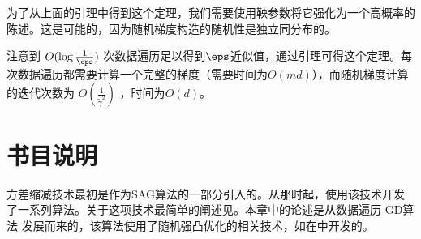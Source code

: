 为了从上面的引理中得到这个定理，我们需要使用鞅参数将它强化为一个高概率的陈述。这是可能的，因为随机梯度构造的随机性是独立同分布的。

注意到 $O(\log \frac{1}{\eps})$ 次数据遍历足以得到$\eps$近似值，通过引理可得这个定理。每次数据遍历都需要计算一个完整的梯度（需要时间为$O(md)$），而随机梯度计算的迭代次数为 $\tilde{O}(\frac{1}{\tilde{\gamma}^2})$ ，时间为$O(d)$。



\newpage
\section{
    书目说明
    }

方差缩减技术最初是作为SAG算法\cite{schmidt2017minimizing}的一部分引入的。从那时起，使用该技术开发了一系列算法。关于这项技术最简单的阐述见\cite{johnson2013accelerating}。本章中的论述是从数据遍历 GD算法  \cite{hazan2014beyond}发展而来的，该算法使用了随机强凸优化的相关技术，如在\cite{zhang2013linear}中开发的。

